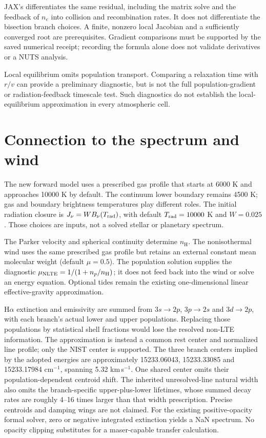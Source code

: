 \documentclass[11pt,a4paper]{article}
\newcommand{\nH}{n_{\mathrm H}}
\begin{document}
JAX's  differentiates the same residual, including the
matrix solve and the feedback of $n_e$ into collision and recombination
rates. It does not differentiate the bisection branch choices. A finite,
nonzero local Jacobian and a sufficiently converged root are prerequisites.
Gradient comparisons must be supported by the saved numerical receipt;
recording the formula alone does not validate derivatives or a NUTS analysis.

Local equilibrium omits population transport. Comparing a relaxation time
with $r/v$ can provide a preliminary diagnostic, but is not the full
population-gradient or radiation-feedback timescale test. Such diagnostics
do not establish the local-equilibrium approximation in every atmospheric cell.

\section{Connection to the spectrum and wind}
The new forward model uses a prescribed gas profile that starts at 6000 K
and approaches 10000 K by default. The continuum lower boundary remains
4500 K; gas and boundary brightness temperatures play different roles.
The initial radiation closure is $J_\nu=W B_\nu(T_{\rm rad})$, with default
$T_{\rm rad}=10000$ K and $W=0.025$. Those choices are inputs, not a solved
stellar or planetary spectrum.

The Parker velocity and spherical continuity determine $\nH$. The
nonisothermal wind uses the same prescribed gas profile but retains an
external constant mean molecular weight (default $\mu=0.5$). The population
solution supplies the diagnostic $\mu_{\rm NLTE}=1/(1+n_p/\nH)$; it does
not feed back into the wind or solve an energy equation. Optional tides
remain the existing one-dimensional linear effective-gravity approximation.

H$\alpha$ extinction and emissivity are summed from $3s\to2p$, $3p\to2s$
and $3d\to2p$, with each branch's actual lower and upper populations.
Replacing those populations by statistical shell fractions would lose the
resolved non-LTE information. The approximation is instead a common
rest center and normalized line profile; only the NIST center is supported.
The three branch centers implied by the adopted energies are approximately
15233.06043, 15233.33085 and 15233.17984 cm$^{-1}$, spanning 5.32 km\,s$^{-1}$.
One shared center omits their population-dependent centroid shift. The inherited
unresolved-line natural width also omits the branch-specific upper-plus-lower
lifetimes, whose summed decay rates are roughly 4--16 times larger than that
width prescription. Precise centroids and damping wings are not claimed.
For the existing positive-opacity formal solver, zero or negative integrated
extinction yields a NaN spectrum. No opacity clipping substitutes for a
maser-capable transfer calculation.
\end{document}
